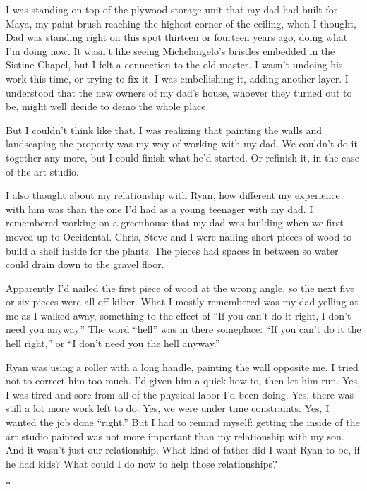 \documentclass[12pt]{book}
\begin{document}
I was standing on top of the plywood storage unit that my dad had built for Maya, my paint brush reaching the highest corner of the ceiling, when I thought, Dad was standing right on this spot thirteen or fourteen years ago, doing what I'm doing now. It wasn't like seeing Michelangelo's bristles embedded in the Sistine Chapel, but I felt a connection to the old master. I wasn't undoing his work this time, or trying to fix it. I was embellishing it, adding another layer. I understood that the new owners of my dad's house, whoever they turned out to be, might well decide to demo the whole place.

But I couldn't think like that. I was realizing that painting the walls and landscaping the property was my way of working with my dad. We couldn't do it together any more, but I could finish what he'd started. Or refinish it, in the case of the art studio.

I also thought about my relationship with Ryan, how different my experience with him was than the one I'd had as a young teenager with my dad. I remembered working on a greenhouse that my dad was building when we first moved up to Occidental. Chris, Steve and I were nailing short pieces of wood to build a shelf inside for the plants. The pieces had spaces in between so water could drain down to the gravel floor.

Apparently I'd nailed the first piece of wood at the wrong angle, so the next five or six pieces were all off kilter. What I mostly remembered was my dad yelling at me as I walked away, something to the effect of ``If you can't do it right, I don't need you anyway.'' The word ``hell'' was in there someplace: ``If you can't do it the hell right,'' or ``I don't need you the hell anyway.''

Ryan was using a roller with a long handle, painting the wall opposite me. I tried not to correct him too much. I'd given him a quick how-to, then let him run. Yes, I was tired and sore from all of the physical labor I'd been doing. Yes, there was still a lot more work left to do. Yes, we were under time constraints. Yes, I wanted the job done ``right.'' But I had to remind myself: getting the inside of the art studio painted was not more important than my relationship with my son. And it wasn't just our relationship. What kind of father did I want Ryan to be, if he had kids? What could I do now to help those relationships?

\begin{center}$*$\end{center}
\end{document}
